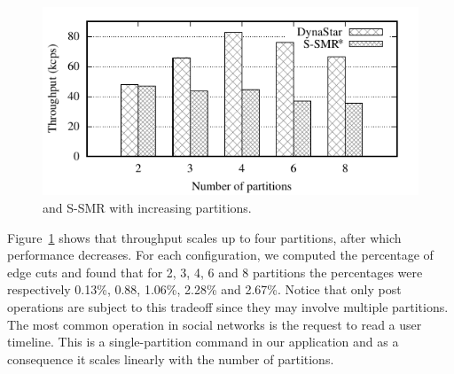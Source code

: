 \begin{figure}[ht]
	\includegraphics[width=0.95\columnwidth]{figures/socc/socc-throughput-avg-vary-partition}
	\caption{\dynastar and S-SMR with increasing partitions.}
	\label{fig:4p1p_varying_partition_size}
\end{figure}

Figure~\ref{fig:4p1p_varying_partition_size} shows that \dynastar throughput scales up to four partitions, after which performance decreases.
For each configuration, we computed the percentage of edge cuts and found that for 2, 3, 4, 6 and 8 partitions the percentages were respectively 
0.13\%, 0.88, 1.06\%, 2.28\% and 2.67\%.
Notice that only post operations are subject to this tradeoff since they may involve multiple partitions.
The most common operation in social networks is the request to read a user timeline. This is a single-partition
command in our application and as a consequence it scales linearly with the number of partitions.



